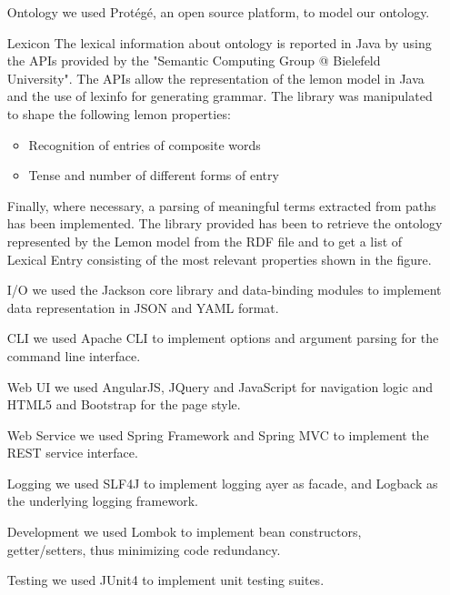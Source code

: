 \begin{itemize}
	\item[Ontology] we used Protégé, an open source platform, to model our ontology.
	
	\item[Lexicon] The lexical information about ontology is reported in Java by using the APIs provided by the "Semantic Computing Group @ Bielefeld University". The APIs allow the representation of the lemon model in Java and the use of lexinfo for generating grammar. The library was manipulated to shape the following lemon properties: 
	\begin{itemize}
		\item Recognition of entries of composite words
		\item Tense and number of different forms of entry 
	\end{itemize}	

Finally, where necessary, a parsing of meaningful terms extracted from paths has been implemented.
%
The library provided has been to retrieve the ontology represented by the Lemon model from the RDF file and to get a list of Lexical Entry consisting of the most relevant properties shown in the figure.

	\item[I/O] we used the Jackson core library and data-binding modules to implement data representation in JSON and YAML format.
	
	\item[CLI] we used Apache CLI to implement options and argument parsing for the command line interface.
	
	\item[Web UI] we used AngularJS, JQuery and JavaScript for navigation logic and HTML5 and Bootstrap for the page style.
	
	\item[Web Service] we used Spring Framework and Spring MVC to implement the REST service interface.
	
	\item[Logging] we used SLF4J to implement logging ayer as facade, and Logback as the underlying logging framework.
	
	\item[Development] we used Lombok to implement bean constructors, getter/setters, thus minimizing code redundancy.
	
	\item[Testing] we used JUnit4 to implement unit testing suites.
\end{itemize}

